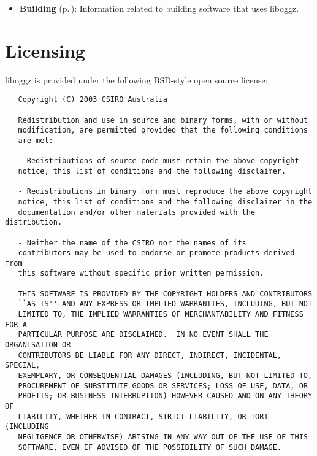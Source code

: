 \begin{itemize}
\item {\bf Building }{\rm (p.\,\pageref{group__building})}: Information related to building software that uses liboggz.\end{itemize}
\section{Licensing}\label{Licensing}
liboggz is provided under the following BSD-style open source license:



\footnotesize\begin{verbatim}   Copyright (C) 2003 CSIRO Australia

   Redistribution and use in source and binary forms, with or without
   modification, are permitted provided that the following conditions
   are met:
   
   - Redistributions of source code must retain the above copyright
   notice, this list of conditions and the following disclaimer.
   
   - Redistributions in binary form must reproduce the above copyright
   notice, this list of conditions and the following disclaimer in the
   documentation and/or other materials provided with the distribution.
   
   - Neither the name of the CSIRO nor the names of its
   contributors may be used to endorse or promote products derived from
   this software without specific prior written permission.
   
   THIS SOFTWARE IS PROVIDED BY THE COPYRIGHT HOLDERS AND CONTRIBUTORS
   ``AS IS'' AND ANY EXPRESS OR IMPLIED WARRANTIES, INCLUDING, BUT NOT
   LIMITED TO, THE IMPLIED WARRANTIES OF MERCHANTABILITY AND FITNESS FOR A
   PARTICULAR PURPOSE ARE DISCLAIMED.  IN NO EVENT SHALL THE ORGANISATION OR
   CONTRIBUTORS BE LIABLE FOR ANY DIRECT, INDIRECT, INCIDENTAL, SPECIAL,
   EXEMPLARY, OR CONSEQUENTIAL DAMAGES (INCLUDING, BUT NOT LIMITED TO,
   PROCUREMENT OF SUBSTITUTE GOODS OR SERVICES; LOSS OF USE, DATA, OR
   PROFITS; OR BUSINESS INTERRUPTION) HOWEVER CAUSED AND ON ANY THEORY OF
   LIABILITY, WHETHER IN CONTRACT, STRICT LIABILITY, OR TORT (INCLUDING
   NEGLIGENCE OR OTHERWISE) ARISING IN ANY WAY OUT OF THE USE OF THIS
   SOFTWARE, EVEN IF ADVISED OF THE POSSIBILITY OF SUCH DAMAGE.

\end{verbatim}\normalsize
 